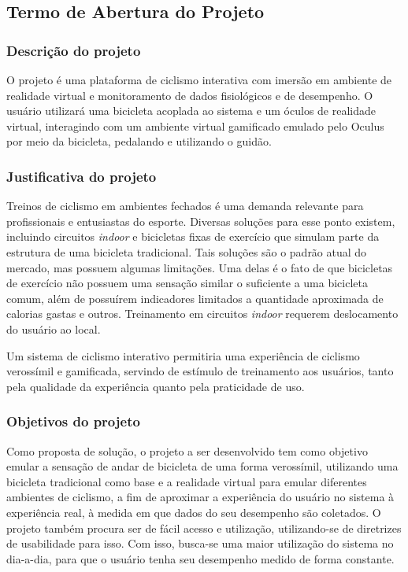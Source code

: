 \begin{apendicesenv}

\partapendices

\chapter{Termo de Abertura do Projeto}

\subsection{Descrição do projeto}

O projeto é uma plataforma de ciclismo interativa com imersão em ambiente de realidade virtual e monitoramento de dados fisiológicos e de desempenho. O usuário utilizará uma bicicleta acoplada ao sistema e um óculos de realidade virtual, interagindo com um ambiente virtual gamificado emulado pelo Oculus por meio da bicicleta, pedalando e utilizando o guidão. 

\subsection{Justificativa do projeto}

Treinos de ciclismo em ambientes fechados é uma demanda relevante para profissionais e entusiastas do esporte. Diversas soluções para esse ponto existem, incluindo circuitos \textit{indoor} e bicicletas fixas de exercício que simulam parte da estrutura de uma bicicleta tradicional. Tais soluções são o padrão atual do mercado, mas possuem algumas limitações. Uma delas é o fato de que bicicletas de exercício não possuem uma sensação similar o suficiente a uma bicicleta comum, além de possuírem indicadores limitados a quantidade aproximada de calorias gastas e outros. Treinamento em circuitos \textit{indoor} requerem deslocamento do usuário ao local.

Um sistema de ciclismo interativo permitiria uma experiência de ciclismo verossímil e gamificada, servindo de estímulo de treinamento aos usuários, tanto pela qualidade da experiência quanto pela praticidade de uso.


\subsection{Objetivos do projeto}

Como proposta de solução, o projeto a ser desenvolvido tem como objetivo emular a sensação de andar de bicicleta de uma forma verossímil, utilizando uma bicicleta tradicional como base e a realidade virtual para emular diferentes ambientes de ciclismo, a fim de aproximar a experiência do usuário no sistema à experiência real, à medida em que dados do seu desempenho são coletados. O projeto também procura ser de fácil acesso e utilização, utilizando-se de diretrizes de usabilidade para isso. Com isso, busca-se uma maior utilização do sistema no dia-a-dia, para que o  usuário tenha seu desempenho medido de forma constante.


\end{apendicesenv}
